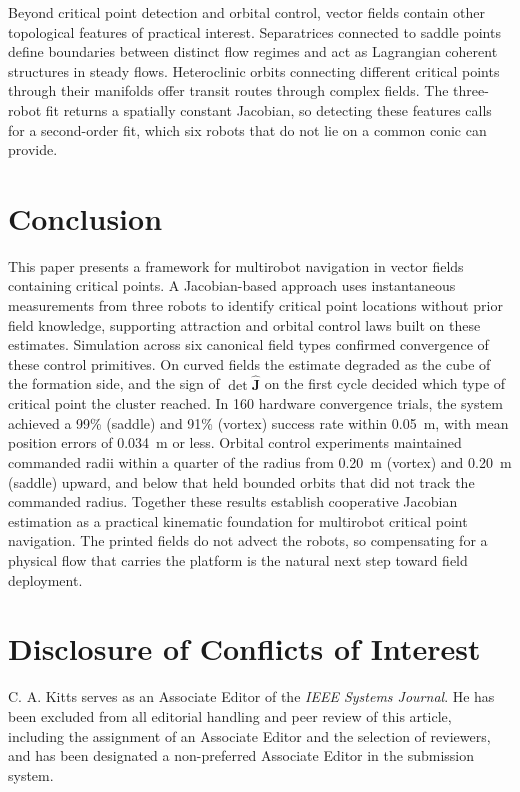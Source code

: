 \documentclass[lettersize,journal]{IEEEtran}
\newcommand{\rev}[1]{#1}
\begin{document}
Beyond critical point detection and orbital control, vector fields contain other topological features of practical interest. Separatrices connected to saddle points define boundaries between distinct flow regimes and act as Lagrangian coherent structures in steady flows. Heteroclinic orbits connecting different critical points through their manifolds offer transit routes through complex fields. The three-robot fit returns a spatially constant Jacobian, so detecting these features calls for a second-order fit, which six robots that do not lie on a common conic can provide.



\section{Conclusion}
\noindent

This paper presents a framework for multirobot navigation in vector fields containing critical points. A Jacobian-based approach uses instantaneous measurements from three robots to identify critical point locations without prior field knowledge, supporting attraction and orbital control laws built on these estimates. Simulation across six canonical field types confirmed convergence of these control primitives. On curved fields the estimate degraded as the cube of the formation side, and the sign of $\det\hat{\mathbf{J}}$ on the first cycle decided which type of critical point the cluster reached. In \rev{160} hardware convergence trials, the system achieved a \rev{99}\% (saddle) and \rev{91}\% (vortex) success rate within 0.05~m, with mean position errors of \rev{0.034}~m or less. Orbital control experiments maintained commanded radii within a quarter of the radius from \rev{0.20}~m (vortex) and \rev{0.20}~m (saddle) upward, and below that held bounded orbits that did not track the commanded radius.
Together these results establish cooperative Jacobian estimation as a practical kinematic foundation for multirobot critical point navigation. The printed fields do not advect the robots, so compensating for a physical flow that carries the platform is the natural next step toward field deployment.


\section*{Disclosure of Conflicts of Interest}

C. A. Kitts serves as an Associate Editor of the \textit{IEEE Systems Journal}. He has been excluded from all editorial handling and peer review of this article, including the assignment of an Associate Editor and the selection of reviewers, and has been designated a non-preferred Associate Editor in the submission system.
\end{document}
